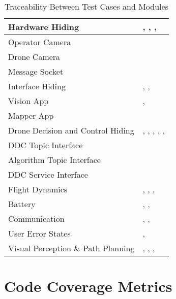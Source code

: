 \documentclass[12pt, titlepage]{article}
\begin{document}
\begin{table}[!h]
\begin{center}
\caption {Traceability Between Test Cases and Modules}
\label{tab:traceTC_Module}
\begin{tabular}{ | m{5cm} | m{10cm} | }
\hline
Hardware Hiding & \nameref{tab:UTCR_001}, \nameref{tab:UTCR_002}, \nameref{tab:UTCR_003}, \nameref{tab:UTCR_004} \\
\hline
Operator Camera & \nameref{tab:UTCR_005}\\
\hline
Drone Camera &  \nameref{tab:UTCR_006}\\
\hline
Message Socket &  \nameref{tab:UTCR_007}\\
\hline
Interface Hiding &  \nameref{tab:UTCR_008}, \nameref{tab:UTCR_009}, \nameref{tab:UTCR_010}\\
\hline
Vision App &  \nameref{tab:UTCR_011}, \nameref{tab:UTCR_012}\\
\hline
Mapper App &  \nameref{tab:UTCR_013}\\
\hline
Drone Decision and Control Hiding &  \nameref{tab:UTCR_014}, \nameref{tab:UTCR_015}, \nameref{tab:UTCR_016}, \nameref{tab:UTCR_017}, \nameref{tab:UTCR_018}, \nameref{tab:UTCR_019} \\
\hline
DDC Topic Interface &  \nameref{tab:UTCR_020}\\
\hline
Algorithm Topic Interface &  \nameref{tab:UTCR_021}\\
\hline
DDC Service Interface &  \nameref{tab:UTCR_022}\\
\hline
Flight Dynamics &  \nameref{tab:STCR_001}, \nameref{tab:STCR_002}, \nameref{tab:STCR_003}, \nameref{tab:STCR_004}\\
\hline
Battery &  \nameref{tab:STCR_005}, \nameref{tab:STCR_006}, \nameref{tab:STCR_007}\\
\hline
Communication &  \nameref{tab:STCR_008}, \nameref{tab:STCR_009}, \nameref{tab:STCR_010}\\
\hline
User Error States &  \nameref{tab:STCR_011}, \nameref{tab:STCR_012}\\
\hline
Visual Perception \& Path Planning &  \nameref{tab:STCR_013}, \nameref{tab:STCR_014}, \nameref{tab:STCR_015}, \nameref{tab:STCR_016}\\
\hline

\end{tabular}
\end{center}
\end{table}		


\section{Code Coverage Metrics}
\end{document}
